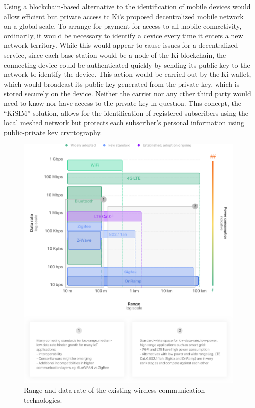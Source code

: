 Using a blockchain-based alternative to the identification of mobile devices would allow efficient but private access to Ki's proposed decentralized mobile network on a global scale. To arrange for payment for access to all mobile connectivity, ordinarily, it would be necessary to identify a device every time it enters a new network territory. While this would appear to cause issues for a decentralized service, since each base station would be a node of the Ki blockchain, the connecting device could be authenticated quickly by sending its public key to the network to identify the device. This action would be carried out by the Ki wallet, which would broadcast its public key generated from the private key, which is stored securely on the device. Neither the carrier nor any other third party would need to know nor have access to the private key in question. This concept, the ``KiSIM'' solution, allows for the identification of registered subscribers using the local meshed network but protects each subscriber's personal information using public-private key cryptography. 
\begin{figure}[!ht]
\centering
	\includegraphics[width=0.9\linewidth, trim= 0cm 0cm 0cm 0cm, clip]{Figures/wireless.png}
	\caption{Range and data rate of the existing wireless communication technologies.}
	\label{fig:wireless}
\end{figure}
